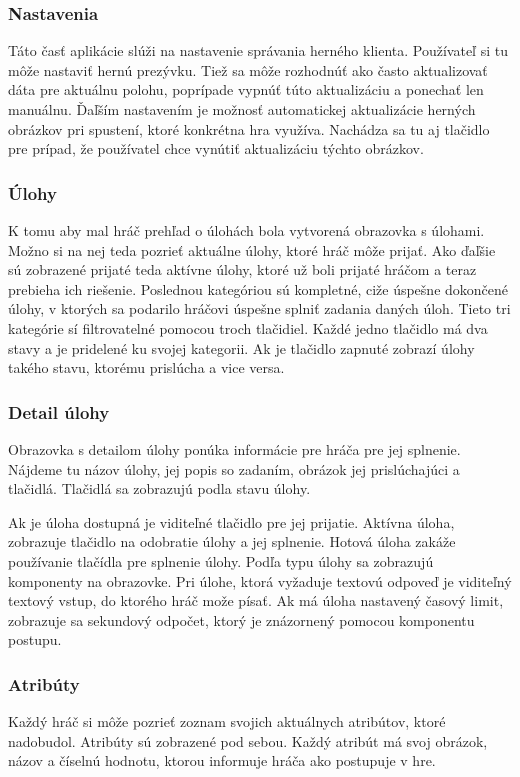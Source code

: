 \subsubsection{Nastavenia}
Táto časť aplikácie slúži na nastavenie správania herného klienta. Používateľ si tu môže nastaviť hernú prezývku. Tiež sa môže rozhodnúť ako často aktualizovať dáta pre aktuálnu polohu, poprípade vypnúť túto aktualizáciu a ponechať len manuálnu. Ďaľším nastavením je možnosť automatickej aktualizácie herných obrázkov pri spustení, ktoré konkrétna hra využíva. Nachádza sa tu aj tlačidlo pre prípad, že používatel chce vynútiť aktualizáciu týchto obrázkov.

\subsubsection{Úlohy}
K tomu aby mal hráč prehľad o úlohách bola vytvorená obrazovka s úlohami. Možno si na nej teda pozrieť aktuálne úlohy, ktoré hráč môže prijať. Ako ďaľšie sú zobrazené prijaté teda aktívne úlohy, ktoré už boli prijaté hráčom a teraz prebieha ich riešenie. Poslednou kategóriou sú kompletné, ciže úspešne dokončené úlohy, v ktorých sa podarilo hráčovi úspešne splniť zadania daných úloh. Tieto tri kategórie sí filtrovatelné pomocou troch tlačidiel. Každé jedno tlačidlo má dva stavy a je pridelené ku svojej kategorii. Ak je tlačidlo zapnuté zobrazí úlohy takého stavu, ktorému prislúcha a vice versa.

\subsubsection{Detail úlohy}
Obrazovka s detailom úlohy ponúka informácie pre hráča pre jej splnenie. Nájdeme tu názov úlohy, jej popis so zadaním, obrázok jej prislúchajúci a tlačidlá. Tlačidlá sa zobrazujú podla stavu úlohy. 

Ak je úloha dostupná je viditeľné tlačidlo pre jej prijatie. 
Aktívna úloha, zobrazuje tlačidlo na odobratie úlohy a jej splnenie. Hotová úloha zakáže používanie tlačídla pre splnenie úlohy. Podľa typu úlohy sa zobrazujú komponenty na obrazovke. Pri úlohe, ktorá vyžaduje textovú odpoveď je viditeľný textový vstup, do ktorého hráč može písať. Ak má úloha nastavený časový limit, zobrazuje sa sekundový odpočet, ktorý je znázornený pomocou komponentu postupu.

\subsubsection{Atribúty}
Každý hráč si môže pozrieť zoznam svojich aktuálnych atribútov, ktoré nadobudol. Atribúty sú zobrazené pod sebou. Každý atribút má svoj obrázok, názov a číselnú hodnotu, ktorou informuje hráča ako postupuje v hre.

